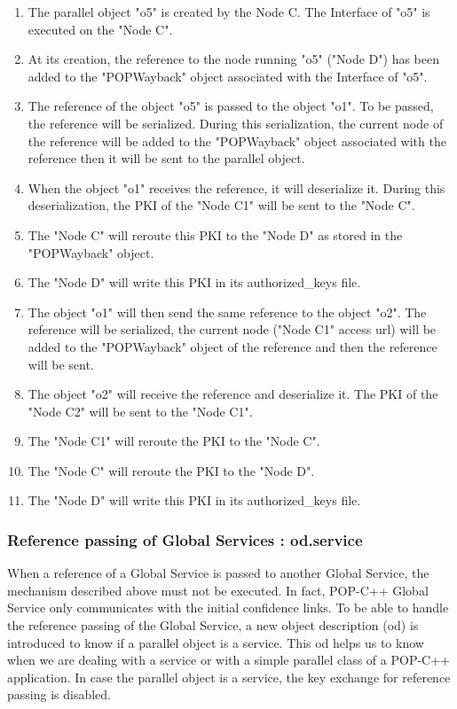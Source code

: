 \begin{enumerate}
\item The parallel object "o5" is created by the Node C. The Interface of "o5" is executed on the "Node C". 
\item At its creation, the reference to the node running "o5" ("Node D") has been added to the "POPWayback" object associated with the Interface of "o5". 
\item The reference of the object "o5" is passed to the object "o1". To be passed, the reference will be serialized. During this serialization, the current node of the reference will be added to the "POPWayback" object associated with the reference then it will be sent to the parallel object. 
\item When the object "o1" receives the reference, it will deserialize it. During this deserialization, the PKI of the "Node C1" will be sent to the "Node C". 
\item The "Node C" will reroute this PKI to the "Node D" as stored in the "POPWayback" object. 
\item The "Node D" will write this PKI in its authorized\_keys file.
\item The object "o1" will then send the same reference to the object "o2". The reference will be serialized, the current node ("Node C1" access url) will be added to the "POPWayback" object of the reference and then the reference will be sent.
\item The object "o2" will receive the reference and deserialize it. The PKI of the "Node C2" will be sent to the "Node C1".
\item The "Node C1" will reroute the PKI to the "Node C". 
\item The "Node C" will reroute the PKI to the "Node D".
\item The "Node D" will write this PKI in its authorized\_keys file.
\end{enumerate} 





\subsubsection{Reference passing of Global Services : od.service}
When a reference of a Global Service is passed to another Global Service, the mechanism described above must not be executed. In fact, POP-C++ Global Service only communicates with the initial confidence links. To be able to handle the reference passing of the Global Service, a new object description (od) is introduced to know if a parallel object is a service. This od helps us to know when we are dealing with a service or with a simple parallel class of a POP-C++ application. In case the parallel object is a service, the key exchange for reference passing is disabled. 

